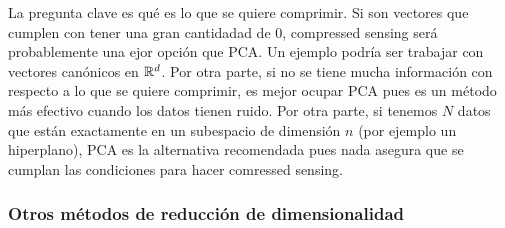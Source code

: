 La pregunta clave es qué es lo que se quiere comprimir. Si son vectores que cumplen con tener una gran cantidadad de $0$, compressed sensing será probablemente una ejor opción que PCA. Un ejemplo podría ser trabajar con vectores canónicos en $\mathbb{R}^d$. Por otra parte, si no se tiene mucha información con respecto a lo que se quiere comprimir, es mejor ocupar PCA pues es un método más efectivo cuando los datos tienen ruido. Por otra parte, si tenemos $N$ datos que están exactamente en un subespacio de dimensión $n$ (por ejemplo un hiperplano), PCA es la alternativa recomendada pues nada asegura que se cumplan las condiciones para hacer comressed sensing. 


\subsubsection{Otros métodos de reducción de dimensionalidad}

